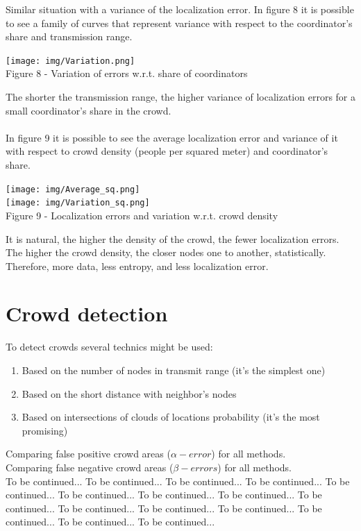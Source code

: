 \documentclass[12pt,a4paper]{report}
\begin{document}
Similar situation with a variance of the localization error. In figure 8 it is possible to see a family of curves that represent variance with respect to the coordinator's share and transmission range. 
\begin{center}
    \texttt{[image: img/Variation.png]}\\
    Figure 8 - Variation of errors w.r.t. share of coordinators
\end{center}
The shorter the transmission range, the higher variance of localization errors for a small coordinator's share in the crowd.\\\\
In figure 9 it is possible to see the average localization error and variance of it with respect to crowd density (people per squared meter) and coordinator's share. 
\begin{center}
    \texttt{[image: img/Average\_sq.png]}\\
    \texttt{[image: img/Variation\_sq.png]}\\
    Figure 9 - Localization errors and variation w.r.t. crowd density
\end{center}
It is natural, the higher the density of the crowd, the fewer localization errors. The higher the crowd density, the closer nodes one to another, statistically. Therefore, more data, less entropy, and less localization error.
\section*{Crowd detection}
To detect crowds several technics might be used:
\begin{enumerate}
    \item Based on the number of nodes in transmit range (it's the simplest one)
    \item Based on the short distance with neighbor's nodes
    \item Based on intersections of clouds of locations probability (it's the most promising)
\end{enumerate}
Comparing false positive crowd areas ($\alpha-error$) for all methods.\\
Comparing false negative crowd areas ($\beta-errors$) for all methods.\\
To be continued...  To be continued...  To be continued...  To be continued...  To be continued...  To be continued...  To be continued...  To be continued...  To be continued...  To be continued...  To be continued...  To be continued...  To be continued...  To be continued...  To be continued...  
\end{document}
